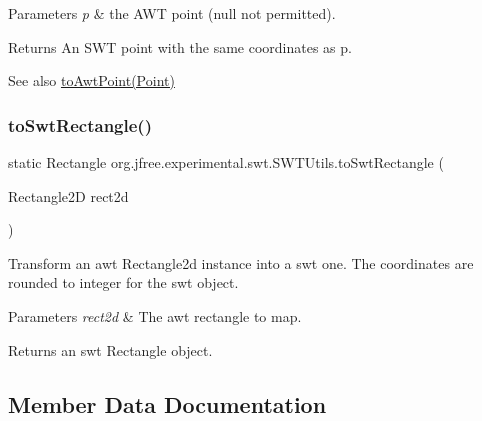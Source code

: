 \begin{DoxyParams}{Parameters}
{\em p} & the A\+WT point ({\ttfamily null} not permitted).\\
\hline
\end{DoxyParams}
\begin{DoxyReturn}{Returns}
An S\+WT point with the same coordinates as {\ttfamily p}.
\end{DoxyReturn}
\begin{DoxySeeAlso}{See also}
\mbox{\hyperlink{classorg_1_1jfree_1_1experimental_1_1swt_1_1_s_w_t_utils_a37dca36eab604131de7d92e9a033df38}{to\+Awt\+Point(\+Point)}} 
\end{DoxySeeAlso}
\mbox{\label{classorg_1_1jfree_1_1experimental_1_1swt_1_1_s_w_t_utils_a1315630eeb89b1518aec74e266282c71}} 
\subsubsection{\texorpdfstring{to\+Swt\+Rectangle()}{toSwtRectangle()}}
{\footnotesize\ttfamily static Rectangle org.\+jfree.\+experimental.\+swt.\+S\+W\+T\+Utils.\+to\+Swt\+Rectangle (\begin{DoxyParamCaption}\item[{Rectangle2D}]{rect2d }\end{DoxyParamCaption})\hspace{0.3cm}{\ttfamily [static]}}

Transform an awt Rectangle2d instance into a swt one. The coordinates are rounded to integer for the swt object. 
\begin{DoxyParams}{Parameters}
{\em rect2d} & The awt rectangle to map. \\
\hline
\end{DoxyParams}
\begin{DoxyReturn}{Returns}
an swt {\ttfamily Rectangle} object. 
\end{DoxyReturn}


\subsection{Member Data Documentation}
\mbox{\label{classorg_1_1jfree_1_1experimental_1_1swt_1_1_s_w_t_utils_aa8f2a5fd8c4bb9531fb489b3bddbbb63}} 
